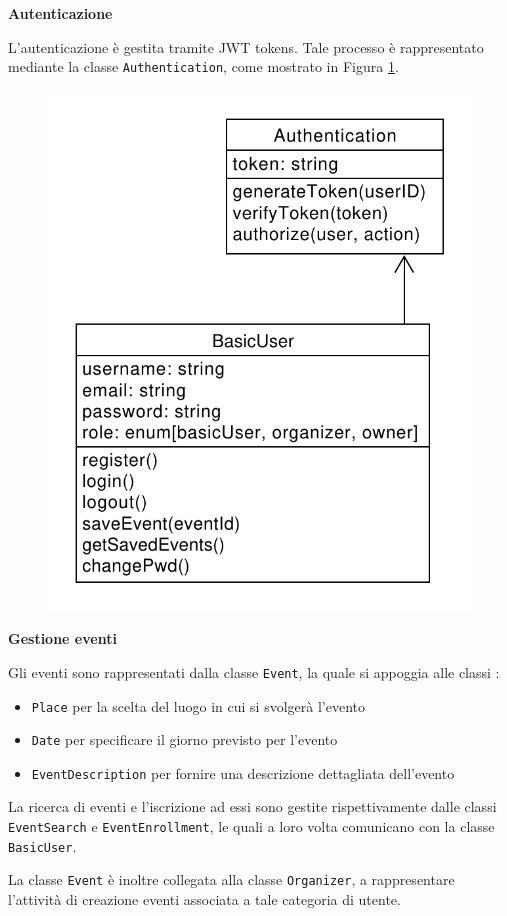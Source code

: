 \documentclass[9pt]{extarticle}
\begin{document}
\newpage

\textbf{Autenticazione}

L'autenticazione è gestita tramite JWT tokens. Tale processo è rappresentato mediante la classe \verb*|Authentication|, come mostrato in Figura \ref{fig:classDiagramAuthentication}.


\begin{figure}[!htb]
	\centering
	\includegraphics[width=.5\linewidth]{./images/classDiagramAuthentication.pdf}
	\caption{}
	\label{fig:classDiagramAuthentication}
\end{figure}

\textbf{Gestione eventi}

Gli eventi sono rappresentati dalla classe \verb*|Event|, la quale si appoggia alle classi :
\begin{itemize}
	\item \verb*|Place| per la scelta del luogo in cui si svolgerà l'evento
	\item \verb*|Date| per specificare il giorno previsto per l'evento
	\item \verb*|EventDescription| per fornire una descrizione dettagliata dell'evento
\end{itemize}

La ricerca di eventi e l'iscrizione ad essi sono gestite rispettivamente dalle classi \verb*|EventSearch| e \verb*|EventEnrollment|, le quali a loro volta comunicano con la classe \verb*|BasicUser|.

La classe \verb*|Event| è inoltre collegata alla classe \verb*|Organizer|, a rappresentare l'attività di creazione eventi associata a tale categoria di utente.

\newpage
\end{document}
